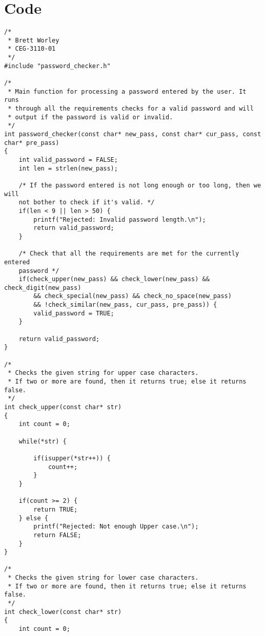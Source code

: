 \documentclass[12pt,letterpaper]{article}
\begin{document}
\section{Code}


\begin{lstlisting}
/*
 * Brett Worley
 * CEG-3110-01
 */
#include "password_checker.h"

/*
 * Main function for processing a password entered by the user. It runs
 * through all the requirements checks for a valid password and will
 * output if the password is valid or invalid.
 */
int password_checker(const char* new_pass, const char* cur_pass, const char* pre_pass)
{
	int valid_password = FALSE;
	int len = strlen(new_pass);

	/* If the password entered is not long enough or too long, then we will
	not bother to check if it's valid. */
	if(len < 9 || len > 50) {
		printf("Rejected: Invalid password length.\n");
		return valid_password;
	}

	/* Check that all the requirements are met for the currently entered
	password */
	if(check_upper(new_pass) && check_lower(new_pass) && check_digit(new_pass)
		&& check_special(new_pass) && check_no_space(new_pass)
		&& !check_similar(new_pass, cur_pass, pre_pass)) {
		valid_password = TRUE;
	}

	return valid_password;
}

/*
 * Checks the given string for upper case characters.
 * If two or more are found, then it returns true; else it returns false.
 */
int check_upper(const char* str)
{
	int count = 0;

	while(*str) {

		if(isupper(*str++)) {
			count++;
		}
	}

	if(count >= 2) {
		return TRUE;
	} else {
		printf("Rejected: Not enough Upper case.\n");
		return FALSE;
	}
}

/*
 * Checks the given string for lower case characters.
 * If two or more are found, then it returns true; else it returns false.
 */
int check_lower(const char* str)
{
	int count = 0;


\end{lstlisting}
\end{document}
